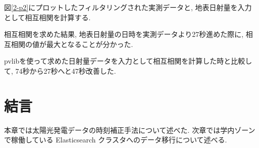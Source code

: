 図\ref{2-p2}にプロットしたフィルタリングされた実測データと, 地表日射量を入力として相互相関を計算する.

相互相関を求めた結果, 地表日射量の日時を実測データより27秒進めた際に, 相互相関の値が最大となることが分かった.

pvlibを使って求めた日射量データを入力として相互相関を計算した時と比較して, 74秒から27秒へと47秒改善した.

\section{結言}
本章では太陽光発電データの時刻補正手法について述べた. 
次章では学内ゾーンで稼働している Elasticsearch クラスタへのデータ移行について述べる.